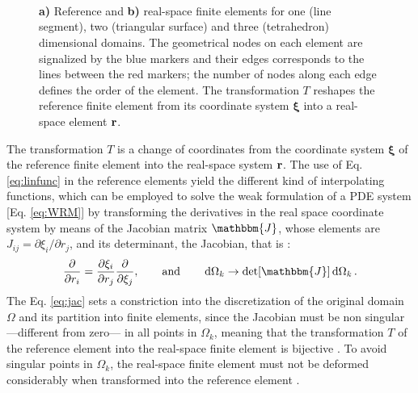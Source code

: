  \begin{figure}[h!]
    \centering
    \small
        \def\svgwidth{.8\textwidth}
        \vspace*{-15em}\\
    \hspace*{-.8\textwidth}
        \begin{subfigure}{\textwidth}\caption{ }\label{fig:FinEleEx:a}\end{subfigure}
        \vspace*{5em}\\
    \hspace*{-.8\textwidth}
        \begin{subfigure}{\textwidth}\caption{ }\label{fig:FinEleEx:b}\end{subfigure}
    \vspace*{6em}\\
 \caption[References an Real-space Finite Elements]{ \textbf{a)} Reference and \textbf{b)} real-space finite elements for one (line segment), two (triangular surface) and three (tetrahedron) dimensional domains. The geometrical nodes on each element are signalized by the blue markers and their edges corresponds to the lines between the red markers; the number of nodes along each edge defines the order of the element. The transformation $T$ reshapes the reference finite element from its coordinate system $\boldsymbol{\xi}$ into a real-space element $\vb{r}$. }
\label{fig:FinEleEx}
\end{figure}

The transformation $T$ is a change of coordinates from the coordinate system $\boldsymbol{\xi}$  of the reference finite element into the real-space system $\vb{r}$. The use of Eq. \eqref{eq:linfunc} in the reference elements yield the different kind of interpolating functions, which can be employed to solve the weak formulation of a PDE system [Eq. \eqref{eq:WRM}] by transforming the derivatives in the real space coordinate system by means of the Jacobian matrix $\mathbbm{J}$, whose elements are $J_{ij} = \partial \xi_i/\partial r_j$, and its determinant, the Jacobian, that is \cite{dhatt_finite_2012,fletcher_computational_1984}:
%
\begin{align}
    \pdv{r_i} = \pdv{\xi_i}{r_j} \pdv{\xi_j},
    \qquad
    \text{and}
    \qquad
    \dd{\Omega_k} \to \det[\mathbbm{J}]\dd{\Omega_k}.
\label{eq:jac}
\end{align}
%
The Eq. \eqref{eq:jac} sets a constriction into the discretization of the original domain $\Omega$ and its partition into finite elements, since the Jacobian must be non singular ---different from zero--- in all points in $\Omega_k$, meaning that the transformation $T$ of the reference element into the real-space finite element is bijective \cite{dhatt_finite_2012,fletcher_computational_1984}. To avoid singular points in $\Omega_k$, the real-space finite element must not be deformed considerably when transformed into the reference element \cite{dhatt_finite_2012}.

